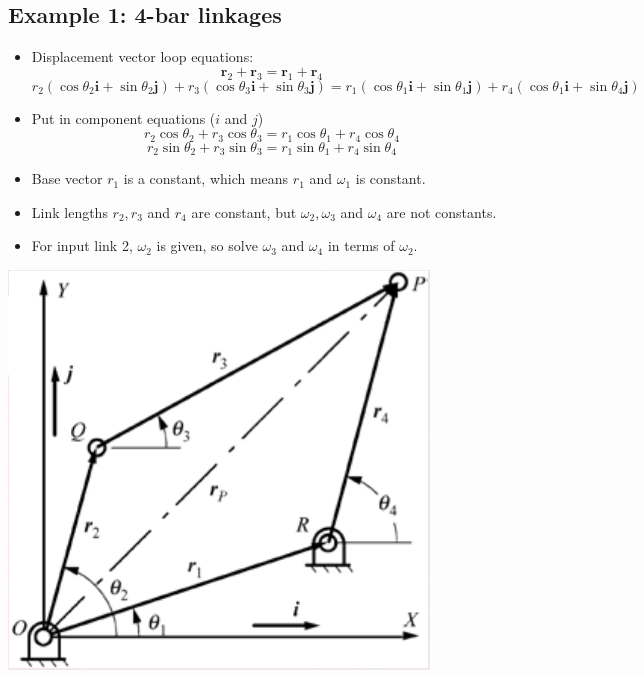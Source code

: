 \documentclass[11pt]{article}
\begin{document}
\subsection{Example 1: 4-bar linkages}
\label{sec:org1b74ba7}
\begin{itemize}
\item Displacement vector loop equations:
\[\boldsymbol{r}_2 + \boldsymbol{r}_3 = \boldsymbol{r}_1 + \boldsymbol{r}_4\]
\[r_2 (\cos \theta_2 \boldsymbol{i} + \sin \theta_2 \boldsymbol{j}) + r_3 (\cos \theta_3 \boldsymbol{i} + \sin \theta_3 \boldsymbol{j}) = r_1 (\cos \theta_1 \boldsymbol{i} + \sin \theta_1 \boldsymbol{j}) + r_4 (\cos \theta_1 \boldsymbol{i} + \sin \theta_4 \boldsymbol{j})\]
\item Put in component equations (\(i\) and \(j\))
\[r_2 \cos \theta_2 + r_3 \cos \theta_3 = r_1 \cos \theta_1 + r_4 \cos \theta_4\]
\[r_2 \sin \theta_2 + r_3 \sin \theta_3 = r_1 \sin \theta_1 + r_4 \sin \theta_4\]
\item Base vector \(r_1\) is a constant, which means \(r_1\) and \(\omega_1\) is constant.
\item Link lengths \(r_2, r_3\) and \(r_4\) are constant, but \(\omega_2, \omega_3\) and \(\omega_4\) are not constants.
\item For input link 2, \(\omega_2\) is given, so solve \(\omega_3\) and \(\omega_4\) in terms of \(\omega_2\).
\end{itemize}

\begin{center}
\includegraphics[width=.9\linewidth]{./images/4-bar-linkage-vector-loop-example.png}
\end{center}
\end{document}

